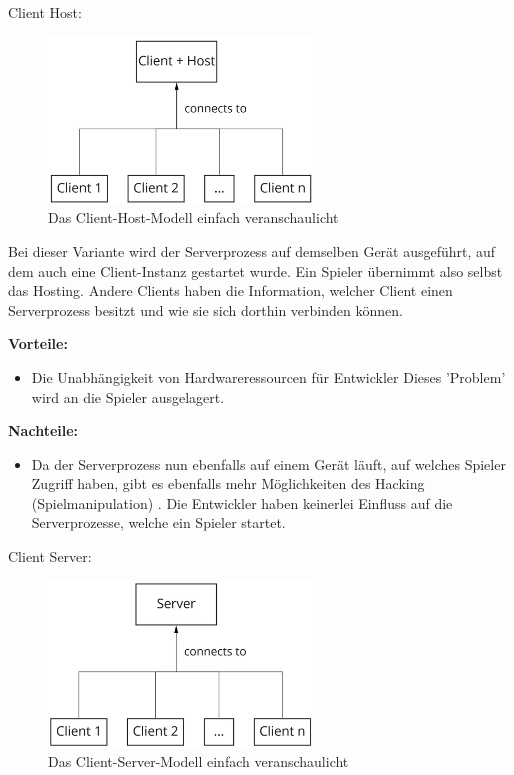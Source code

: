 \textsf{\Large Client Host:}

\begin{figure}[H]
	\centering
	\includegraphics[width=70mm]{images/Client_Host.jpg}
	\caption[Client-Server Modell]{Das Client-Host-Modell einfach veranschaulicht}
	\label{pic:Client_Host}
\end{figure}

Bei dieser Variante wird der Serverprozess auf demselben Gerät ausgeführt, auf dem auch eine Client-Instanz gestartet wurde. Ein Spieler übernimmt also selbst das Hosting. Andere Clients haben die Information, welcher Client einen Serverprozess besitzt und wie sie sich dorthin verbinden können. 

\textbf{Vorteile:}
\begin{itemize}
	\item Die Unabhängigkeit von Hardwareressourcen für Entwickler Dieses 'Problem' wird an die Spieler ausgelagert. 
\end{itemize}

\textbf{Nachteile:} 
\begin{itemize}
	\item Da der Serverprozess nun ebenfalls auf einem Gerät läuft, auf welches Spieler Zugriff haben, gibt es ebenfalls mehr Möglichkeiten des Hacking (Spielmanipulation) \cite{Wikipedia.2021h}. Die Entwickler haben keinerlei Einfluss auf die Serverprozesse, welche ein Spieler startet. \cite{Smed.2002}
\end{itemize}

\newpage
\textsf{\Large Client Server:}

\begin{figure}[H]
\centering
\includegraphics[width=70mm]{images/Client_Server.jpg}
\caption[Client-Server Modell]{Das Client-Server-Modell einfach veranschaulicht}
\label{pic:Client_Server}
\end{figure}

